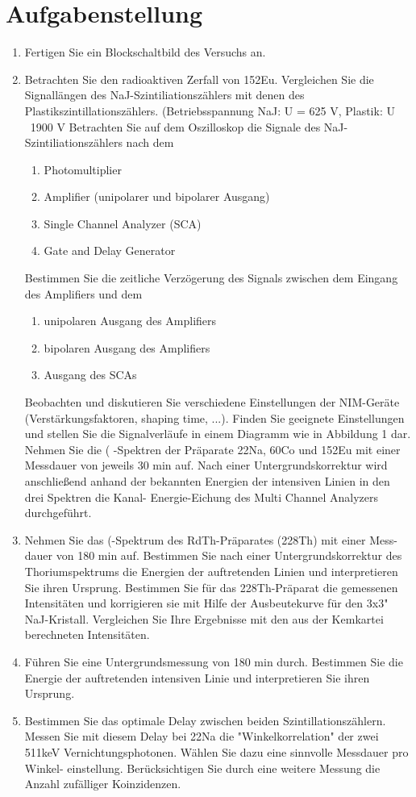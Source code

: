 \section{Aufgabenstellung}
\begin{enumerate}
 \item Fertigen Sie ein Blockschaltbild des Versuchs an.
 \item Betrachten Sie den radioaktiven Zerfall von 152Eu.
	Vergleichen Sie die Signallängen des NaJ-Szintiliationszählers mit denen des
	Plastikszintillationszählers. (Betriebsspannung NaJ: U = 625 V, Plastik: U ~1900 V
	Betrachten Sie auf dem Oszilloskop die Signale des NaJ-Szintiliationszählers
	nach dem
	\begin{enumerate}
	\item Photomultiplier
	\item Amplifier (unipolarer und bipolarer Ausgang)
	\item Single Channel Analyzer (SCA)
	\item Gate and Delay Generator
	\end{enumerate}
	Bestimmen Sie die zeitliche Verzögerung des Signals zwischen dem Eingang
	des Amplifiers und dem
	\begin{enumerate}
	 \item unipolaren Ausgang des Amplifiers
	 \item bipolaren Ausgang des Amplifiers
	 \item Ausgang des SCAs
	\end{enumerate}

	Beobachten und diskutieren Sie verschiedene Einstellungen der NIM-Geräte
	(Verstärkungsfaktoren, shaping time, ...). Finden Sie geeignete Einstellungen
	und stellen Sie die Signalverläufe in einem Diagramm wie in Abbildung 1 dar.
	Nehmen Sie die ( -Spektren der Präparate 22Na, 60Co und 152Eu mit einer Messdauer
	von jeweils 30 min auf. Nach einer Untergrundskorrektur wird anschließend anhand
	der bekannten Energien der intensiven Linien in den drei Spektren die Kanal-
	Energie-Eichung des Multi Channel Analyzers durchgeführt.
\item Nehmen Sie das (-Spektrum des RdTh-Präparates (228Th) mit einer Mess-
dauer von 180 min auf. Bestimmen Sie nach einer Untergrundskorrektur des
Thoriumspektrums die Energien der auftretenden Linien und interpretieren Sie ihren
Ursprung. Bestimmen Sie für das 228Th-Präparat die gemessenen Intensitäten und
korrigieren sie mit Hilfe der Ausbeutekurve für den 3x3" NaJ-Kristall. Vergleichen Sie
Ihre Ergebnisse mit den aus der Kemkartei berechneten Intensitäten.
\item Führen Sie eine Untergrundsmessung von 180 min durch. Bestimmen Sie die
Energie der auftretenden intensiven Linie und interpretieren Sie ihren Ursprung.
\item Bestimmen Sie das optimale Delay zwischen beiden Szintillationszählern.
Messen Sie mit diesem Delay bei 22Na die "Winkelkorrelation" der zwei 511keV
Vernichtungsphotonen. Wählen Sie dazu eine sinnvolle Messdauer pro Winkel-
einstellung.
Berücksichtigen Sie durch eine weitere Messung die Anzahl zufälliger
Koinzidenzen.


\end{enumerate}
